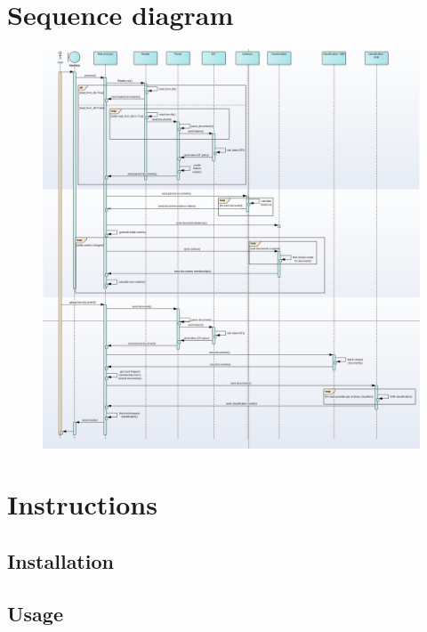 \chapter{Sequence diagram} \label{appendix-sequence}
\begin{figure}[h]
	\begin{center}
		\includegraphics[width=1.2\linewidth]{images/diagrams/seq-full.png}
		\label{appendix-sequence-diagram}
	\end{center}
\end{figure}


\chapter{Instructions}
\section{Installation}
\section{Usage}